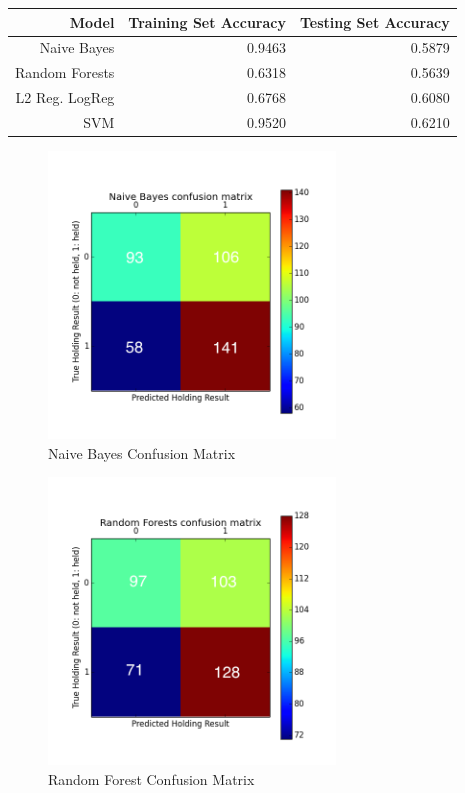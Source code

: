 \documentclass[journal]{IEEEtran}
\begin{document}
\begin{table}[ht]
\centering
\begin{tabular}{rrr}
  \hline
Model & Training Set Accuracy & Testing Set Accuracy \\
  \hline
Naive Bayes &	0.9463 & 0.5879	\\
Random Forests & 0.6318 &  0.5639	 \\
L2 Reg. LogReg  &	0.6768 &	0.6080 \\
SVM & 0.9520 &  0.6210 \\
   \hline
\end{tabular}
\end{table}

\begin{figure}
    \centering
    \includegraphics[width=3in]{nbConfusion.png}
    \caption{Naive Bayes Confusion Matrix}
    \label{fig:nb}
\end{figure}

\begin{figure}
    \centering
    \includegraphics[width=3in]{rfConfusion.png}
    \caption{Random Forest Confusion Matrix}
    \label{fig:nb}
\end{figure}
\end{document}
